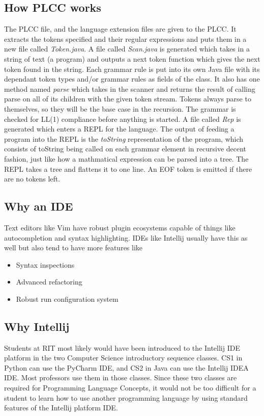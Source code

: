 \documentclass[conference, letterpaper]{IEEEtran}
\begin{document}
\subsection{How PLCC works}\label{subsec:how-plcc-works}
The PLCC file, and the language extension files are given to the PLCC\@.
It extracts the tokens specified and their regular expressions and puts them in a new file called \textit{Token.java}.
A file called \textit{Scan.java} is generated which takes in a string of text (a program) and outputs a next token function which gives the next token found in the string.
Each grammar rule is put into its own Java file with its dependant token types and/or grammar rules as fields of the class.
It also has one method named \textit{parse} which takes in the scanner and returns the result of calling parse on all of its children with the given token stream.
Tokens always parse to themselves, so they will be the base case in the recursion.
The grammar is checked for LL(1) compliance before anything is started.
A file called \textit{Rep} is generated which enters a REPL for the language.
The output of feeding a program into the REPL is the \textit{toString} representation of the program, which consists of toString being called on each grammar element in recursive decent fashion, just like how a mathmatical expression can be parsed into a tree.
The REPL takes a tree and flattens it to one line.
An EOF token is emitted if there are no tokens left.



\subsection{Why an IDE}\label{subsec:why-an-ide}
Text editors like Vim have robust plugin ecosystems capable of things like autocompletion and syntax highlighting.
IDEs like Intellij usually have this as well but also tend to have more features like
\begin{itemize}
    \item Syntax inspections
    \item Advanced refactoring
    \item Robust run configuration system
\end{itemize}

\subsection{Why Intellij}\label{subsec:why-intellij}
Students at RIT most likely would have been introduced to the Intellij IDE platform in the two Computer Science introductory sequence classes.
CS1 in Python can use the PyCharm IDE, and CS2 in Java can use the Intellij IDEA IDE.
Most professors use them in those classes.
Since these two classes are required for Programming Language Concepts, it would not be too difficult for a student to learn how to use another programming language by using standard features of the Intellij platform IDE\@.
\end{document}
